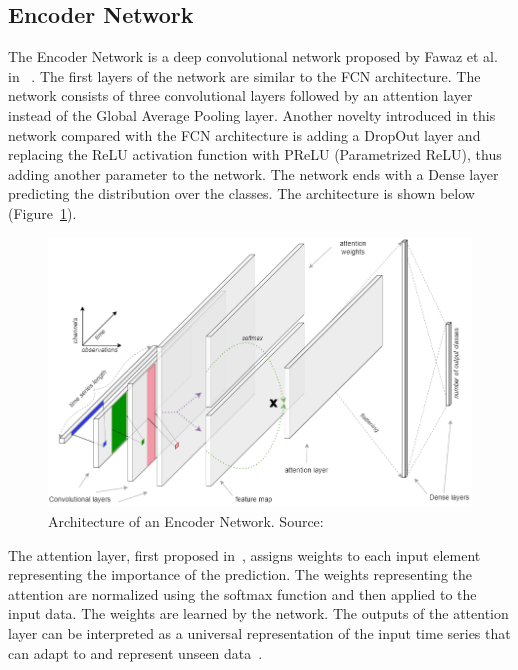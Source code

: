 \documentclass[a4paper,11pt,twoside]{report}
\theoremstyle{definition}
\begin{document}
\FloatBarrier

\subsection{Encoder Network}
 The Encoder Network is a deep convolutional network proposed by Fawaz et al. in ~\cite{encoder}. The first layers of the network are similar to the FCN architecture. The network consists of three convolutional layers followed by an attention layer instead of the Global Average Pooling layer. Another novelty introduced in this network compared with the FCN architecture is adding a DropOut layer and replacing the ReLU activation function with PReLU (Parametrized ReLU), thus adding another parameter to the network. The network ends with a Dense layer predicting the distribution over the classes. The architecture is shown below (Figure~\ref{fig:encoder_img}).

\FloatBarrier

\begin{figure}[h!]
\centering
\includegraphics[width=15.5cm]{imgs/encoder.png}
\caption{Architecture of an Encoder Network. Source:~\cite{dl_tsc}}
\label{fig:encoder_img}
\end{figure}

\FloatBarrier

The attention layer, first proposed in~\cite{attention}, assigns weights to each input element representing the importance of the prediction. The weights representing the attention are normalized using the softmax function and then applied to the input data. The weights  are learned by the network. The outputs of the attention layer can be interpreted as a universal representation of the input time series that can adapt to and represent unseen data~\cite{encoder}.
\end{document}
